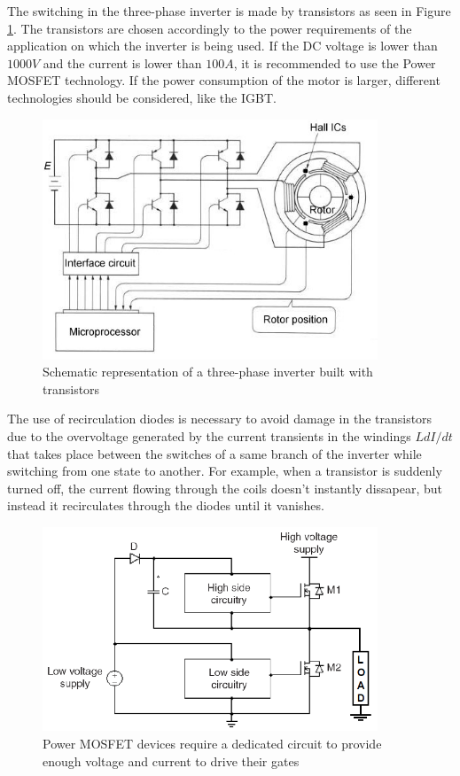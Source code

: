 The switching in the three-phase inverter is made by transistors as seen in Figure \ref{fig:inverter_1}. The transistors are chosen accordingly to the power requirements of the application on which the inverter is being used. If the \ac{DC} voltage is lower than $1000 V$ and the current is lower than $100 A$, it is recommended to use the Power \acf{MOSFET} technology. If the power consumption of the motor is larger, different technologies should be considered, like the \acf{IGBT}.

\begin{figure}[htbp]
\centering
\includegraphics[width=10cm]{Images/inverter_1.png} 
\caption[Three-Phase Inverter]{Schematic representation of a three-phase inverter built with transistors}
\label{fig:inverter_1}
\end{figure}

The use of recirculation diodes is necessary to avoid damage in the transistors due to the overvoltage generated by the current transients in the windings $L dI/dt$ that takes place between the switches of a same branch of the inverter while switching from one state to another. For example, when a transistor is suddenly turned off, the current flowing through the coils doesn't instantly dissapear, but instead it recirculates through the diodes until it vanishes.

\begin{figure}[htbp]
\centering
\includegraphics[width=10cm]{Images/bootstrap.png} 
\caption[High-Side and Low-Side Driving Scheme]{Power MOSFET devices require a dedicated circuit to provide enough voltage and current to drive their gates}
\label{fig:bootstrap}
\end{figure}

